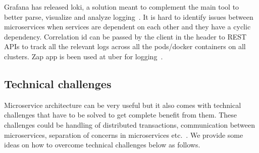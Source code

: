 \par Grafana has released loki, a solution meant to complement the main tool to better parse, visualize and analyze logging~\cite{Kalske2017, Zhang2019}. It is hard to identify issues between microservices when services are dependent on each other and they have a cyclic dependency. Correlation id can be passed by the client in the header to REST APIs to track all the relevant logs across all the pods/docker containers on all clusters. Zap app is been used at uber for logging~\cite{Matt2016}.


\subsection{Technical challenges}%

\par Microservice architecture can be very useful but it also comes with technical challenges that have to be solved to get complete benefit from them. These challenges could be handling of distributed transactions, communication between microservices, separation of concerns in microservices etc.~\cite{Kalske2017,KalskeM2017}. We provide some ideas on how to overcome technical challenges below as follows.

